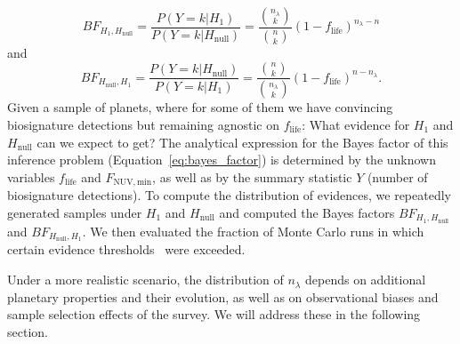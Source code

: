 \documentclass[twocolumn,twocolappendix,linenumbers]{aastex631}
\begin{document}
\begin{equation}\label{eq:bayes_factor}
BF_{H_1,H_\mathrm{null}} = \frac{P(Y=k|H_1)}{P(Y=k|H_\mathrm{null})} = \frac{\binom{n_\lambda}{k}}{\binom{n}{k}}(1-f_\mathrm{life})^{n_{\lambda}-n}
\end{equation}
and
\begin{equation}
    \label{eq:bayes_factor2}
BF_{H_\mathrm{null},H_1} = \frac{P(Y=k|H_\mathrm{null})}{P(Y=k|H_1)} = \frac{\binom{n}{k}}{\binom{n_\lambda}{k}}(1-f_\mathrm{life})^{n-n_{\lambda}}.
\end{equation}
Given a sample of planets, where for some of them we have convincing biosignature detections but remaining agnostic on $f_\mathrm{life}$: What evidence for $H_\mathrm{1}$ and $H_\mathrm{null}$ can we expect to get?
The analytical expression for the Bayes factor of this inference problem (Equation~\ref{eq:bayes_factor}) is determined by the unknown variables $f_\mathrm{life}$ and $F_\mathrm{NUV, min}$, as well as by the summary statistic $Y$ (number of biosignature detections).
To compute the distribution of evidences, we repeatedly generated samples under $H_\mathrm{1}$ and $H_\mathrm{null}$ and computed the Bayes factors $BF_{H_1,H_\mathrm{null}}$ and $BF_{H_\mathrm{null}, H_1}$.
We then evaluated the fraction of Monte Carlo runs in which certain evidence thresholds~\citep{Jeffreys1939} were exceeded.

Under a more realistic scenario, the distribution of $n_{\lambda}$ depends on additional planetary properties and their evolution, as well as on observational biases and sample selection effects of the survey.
We will address these in the following section.
\end{document}
